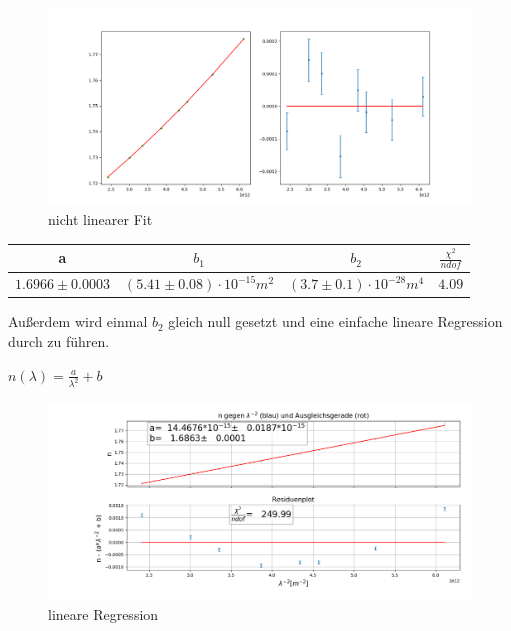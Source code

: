 \documentclass[a4paper, 11pt]{article}
\begin{document}
\begin{figure}[H]
	\centering
	\includegraphics[trim = 0mm 0mm 0mm 0mm,clip, width=15cm]{Bilder/nicht_linearer_fit.png}%
	\caption[nicht linearer Fit]{nicht linearer Fit}%
	\label{pic:Abbildung 1}%
\end{figure}

\begin{center}
\begin{tabular}{|c|c|c|c|}
\hline a & $b_1$ & $b_2$ & $\frac{\chi^2}{ndof}$  \\
\hline  $1.6966\pm 0.0003 $&$(5.41 \pm 0.08)\cdot 10^{-15} m^2 $&$(3.7 \pm 0.1)\cdot 10^{-28}m^4 $& $4.09 $\\
\hline
\end{tabular}
\end{center}

Außerdem wird einmal $b_2$ gleich null gesetzt und eine einfache lineare Regression durch zu führen.
\begin{center}
$n(\lambda)=\frac{a}{\lambda^2}+b$
\end{center}
\begin{figure}[H]
	\centering
	\hskip -2cm
	\includegraphics[trim = 0mm 0mm 0mm 0mm,clip,scale=0.5]{Bilder/lineare_fit.png}%
	\caption[lineare Regression]{lineare Regression}%
	\label{pic:Abbildung 1}%
\end{figure}
 
\end{document}
